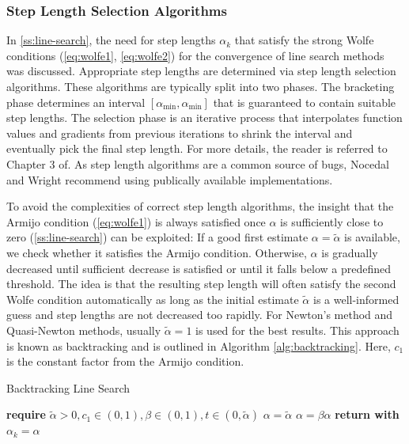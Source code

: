 \subsubsection{Step Length Selection Algorithms}\label{sss:step-length-selection}
In \cref{ss:line-search}, the need for step lengths $\alpha_k$ that satisfy the strong Wolfe conditions (\cref{eq:wolfe1}, \cref{eq:wolfe2})
for the convergence of line search methods was discussed. Appropriate step lengths are determined via step length selection algorithms. 
These algorithms are typically
split into two phases. The bracketing phase determines an interval $[\alpha_{\text{min}}, \alpha_{\text{min}}]$ that is 
guaranteed to contain suitable step lengths. The selection phase is an iterative process that interpolates function values and gradients 
from previous iterations to shrink the interval and eventually pick the final step length. For more details, the reader is 
referred to Chapter 3 of. As step length algorithms are a common source of bugs, Nocedal and Wright recommend using publically 
available implementations.

To avoid the complexities of correct step length algorithms, the insight that the Armijo condition (\cref{eq:wolfe1}) is always satisfied 
once $\alpha$ is sufficiently close to zero (\cref{ss:line-search}) can be exploited: If a good first estimate $\alpha = 
\tilde{\alpha}$ is available,
we check whether it satisfies the Armijo condition. Otherwise, $\alpha$ is gradually decreased until sufficient decrease is satisfied or until
it falls below a predefined threshold. The idea is that the resulting step length will often satisfy the second Wolfe condition automatically 
as long as the initial estimate $\tilde{\alpha}$ is a well-informed guess and step lengths are not decreased too rapidly. For Newton's method
and Quasi-Newton methods, usually $\tilde{\alpha} = 1$ is used for the best results. This approach is known
as backtracking and is outlined in Algorithm \ref{alg:backtracking}. Here, $c_1$ is the constant factor from the Armijo condition.

\begin{algorithm}
\caption{Backtracking Line Search}\label{alg:backtracking}
\begin{algorithmic}
\State \textbf{require } $\tilde{\alpha} > 0, c_1 \in (0, 1), \beta \in (0, 1), t \in (0, \tilde{\alpha})$
\State $\alpha = \tilde{\alpha}$
\State $\alpha = \beta \alpha$
\EndWhile
\State \textbf{return with } $\alpha_k = \alpha$
\EndProcedure
\end{algorithmic}
\end{algorithm}

